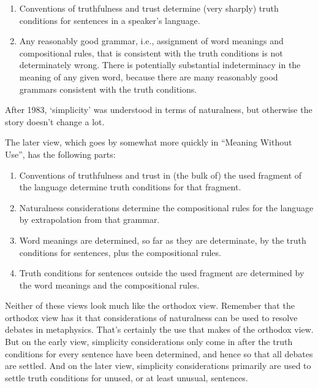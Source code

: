 \begin{enumerate}
\item Conventions of truthfulness and trust determine (very sharply) truth conditions for sentences in a speaker's language.
\item Any reasonably good grammar, i.e., assignment of word meanings and compositional rules, that is consistent with the truth conditions is not determinately wrong. There is potentially substantial indeterminacy in the meaning of any given word, because there are many reasonably good grammars consistent with the truth conditions.
\end{enumerate}

\noindent After 1983, `simplicity' was understood in terms of naturalness, but otherwise the story doesn't change a lot.

The later view, which goes by somewhat more quickly in ``Meaning Without Use'', has the following parts:

\begin{enumerate}
\item Conventions of truthfulness and trust in (the bulk of) the used fragment of the language determine truth conditions for that fragment.
\item Naturalness considerations determine the compositional rules for the language by extrapolation from that grammar.
\item Word meanings are determined, so far as they are determinate, by the truth conditions for sentences, plus the compositional rules. 
\item Truth conditions for sentences outside the used fragment are determined by the word meanings and the compositional rules.
\end{enumerate}

\noindent Neither of these views look much like the orthodox view. Remember that the orthodox view has it that considerations of naturalness can be used to resolve debates in metaphysics. That's certainly the use that \citet{Sider2001-SIDCOP} makes of the orthodox view. But on the early view, simplicity considerations only come in after the truth conditions for every sentence have been determined, and hence so that all debates are settled. And on the later view, simplicity considerations primarily are used to settle truth conditions for unused, or at least unusual, sentences. 

